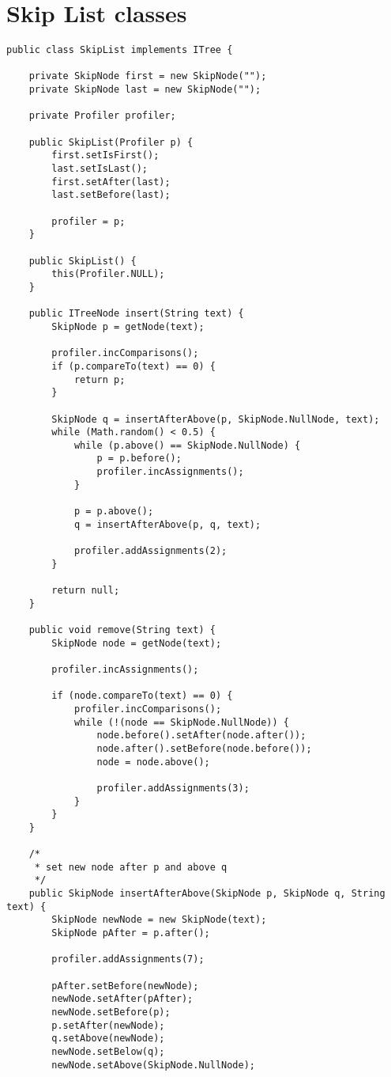 \chapter{Skip List classes}
\lstset{language=Java}
\begin{lstlisting}[caption=Skip List classes Source code - SkipList]
public class SkipList implements ITree {

	private SkipNode first = new SkipNode("");
	private SkipNode last = new SkipNode("");

	private Profiler profiler;

	public SkipList(Profiler p) {
		first.setIsFirst();
		last.setIsLast();
		first.setAfter(last);
		last.setBefore(last);

		profiler = p;
	}

	public SkipList() {
		this(Profiler.NULL);
	}

	public ITreeNode insert(String text) {
		SkipNode p = getNode(text);
		
		profiler.incComparisons();
		if (p.compareTo(text) == 0) {
			return p;
		}

		SkipNode q = insertAfterAbove(p, SkipNode.NullNode, text);
		while (Math.random() < 0.5) {
			while (p.above() == SkipNode.NullNode) {
				p = p.before();
				profiler.incAssignments();
			}

			p = p.above();
			q = insertAfterAbove(p, q, text);

			profiler.addAssignments(2);
		}

		return null;
	}

	public void remove(String text) {
		SkipNode node = getNode(text);

		profiler.incAssignments();

		if (node.compareTo(text) == 0) {
			profiler.incComparisons();
			while (!(node == SkipNode.NullNode)) {
				node.before().setAfter(node.after());
				node.after().setBefore(node.before());
				node = node.above();

				profiler.addAssignments(3);
			}
		}
	}

	/*
	 * set new node after p and above q
	 */
	public SkipNode insertAfterAbove(SkipNode p, SkipNode q, String text) {
		SkipNode newNode = new SkipNode(text);
		SkipNode pAfter = p.after();

		profiler.addAssignments(7);

		pAfter.setBefore(newNode);
		newNode.setAfter(pAfter);
		newNode.setBefore(p);
		p.setAfter(newNode);
		q.setAbove(newNode);
		newNode.setBelow(q);
		newNode.setAbove(SkipNode.NullNode);


\end{lstlisting}
